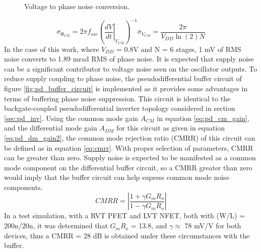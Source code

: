 			\begin{figure}[htb!]
			        \centering
			        
			    \caption{Voltage to phase noise conversion.}
			    \label{fig:voltn_to_pn}
			\end{figure}
			\begin{equation}\label{eq:vnoise_to_pnoise}
					\sigma_{\Phi_{CM}} = 2\pi f_{osc}\left(\left.\frac{dV}{dt}\right|_{V_{CM}}\right)^{-1}\sigma_{V_{CM}} = \frac{2\pi}{V_{DD}\ln(2)N} 
			\end{equation}
		In the case of this work, where $V_{DD}$ = 0.8V and N = 6 stages, 1 mV of RMS noise converts to 1.89 mrad RMS of phase noise. It is expected that supply noise can be a significant contributor to voltage noise seen on the oscillator outputs. To reduce supply coupling to phase noise, the pseudodifferential buffer circuit of figure \ref{fig:pd_buffer_circuit} is implemented as it provides some advantages in terms of buffering phase noise suppression. This circuit is identical to the backgate-coupled pseudodifferential inverter topology considered in section \ref{sec:pd_inv}. Using the common mode gain $A_{CM}$ in equation \ref{eq:pd_cm_gain}, and the differential mode gain $A_{DM}$ for this circuit as given in equation \ref{eq:pd_dm_gain2}, the common mode rejection ratio (CMRR) of this circuit can be defined as in equation \ref{eq:cmrr}. With proper selection of parameters, CMRR can be greater than zero. Supply noise is expected to be manifested as a common mode component on the differential buffer circuit, so a CMRR greater than zero would imply that the buffer circuit can help supress common mode noise components.
				\begin{equation}\label{eq:cmrr}
					CMRR = \left|\frac{1+\gamma G_m R_o}{1-\gamma G_m R_o}\right|
				\end{equation}
		In a test simulation, with a RVT PFET and LVT NFET, both with (W/L) = 200n/20n, it was determined that $G_m R_o$ = 13.8, and $\gamma\approx$ 78 mV/V for both devices, thus a CMRR = 28 dB is obtained under these circumstances with the buffer.

		
